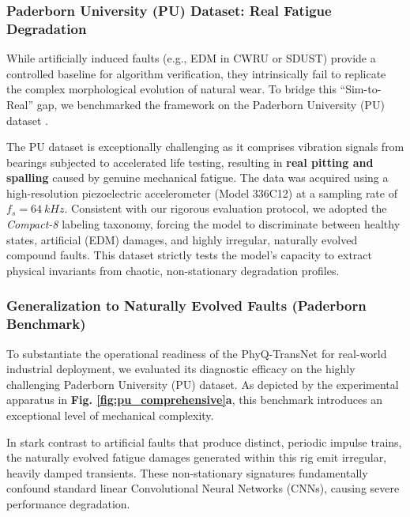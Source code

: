 \documentclass[5p,times,twocolumn]{elsarticle}
\begin{document}
\subsubsection{Paderborn University (PU) Dataset: Real Fatigue Degradation}
While artificially induced faults (e.g., EDM in CWRU or SDUST) provide a controlled baseline for algorithm verification, they intrinsically fail to replicate the complex morphological evolution of natural wear. To bridge this ``Sim-to-Real'' gap, we benchmarked the framework on the Paderborn University (PU) dataset \cite{paderborn_reference}. 



The PU dataset is exceptionally challenging as it comprises vibration signals from bearings subjected to accelerated life testing, resulting in \textbf{real pitting and spalling} caused by genuine mechanical fatigue.
The data was acquired using a high-resolution piezoelectric accelerometer (Model 336C12) at a sampling rate of $f_s = \SI{64}{kHz}$. Consistent with our rigorous evaluation protocol, we adopted the \textit{Compact-8} labeling taxonomy, forcing the model to discriminate between healthy states, artificial (EDM) damages, and highly irregular, naturally evolved compound faults. This dataset strictly tests the model's capacity to extract physical invariants from chaotic, non-stationary degradation profiles.

\subsubsection{Generalization to Naturally Evolved Faults (Paderborn Benchmark)}
To substantiate the operational readiness of the PhyQ-TransNet for real-world industrial deployment, we evaluated its diagnostic efficacy on the highly challenging Paderborn University (PU) dataset. As depicted by the experimental apparatus in \textbf{Fig. \ref{fig:pu_comprehensive}a}, this benchmark introduces an exceptional level of mechanical complexity. 



In stark contrast to artificial faults that produce distinct, periodic impulse trains, the naturally evolved fatigue damages generated within this rig emit irregular, heavily damped transients. These non-stationary signatures fundamentally confound standard linear Convolutional Neural Networks (CNNs), causing severe performance degradation.
\end{document}
